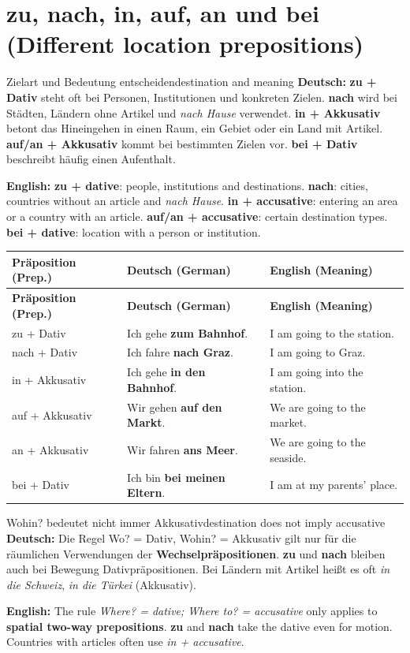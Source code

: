 \documentclass[a4paper,11pt]{article}
\newcommand{\GermanText}[1]{\textbf{Deutsch: }#1\par}
\newcommand{\EnglishText}[1]{{\small\color{SoftGray}\textbf{English: }#1\par}}
\newcommand{\TableHead}[1]{\color{white}\textbf{#1}}
\begin{document}
\section{zu, nach, in, auf, an und bei (Different location prepositions)}
\begin{grammarentry}{Zielart und Bedeutung entscheiden}{destination and meaning}
\GermanText{\textbf{zu + Dativ} steht oft bei Personen, Institutionen und konkreten Zielen. \textbf{nach} wird bei Städten, Ländern ohne Artikel und \emph{nach Hause} verwendet. \textbf{in + Akkusativ} betont das Hineingehen in einen Raum, ein Gebiet oder ein Land mit Artikel. \textbf{auf/an + Akkusativ} kommt bei bestimmten Zielen vor. \textbf{bei + Dativ} beschreibt häufig einen Aufenthalt.}
\EnglishText{\textbf{zu + dative}: people, institutions and destinations. \textbf{nach}: cities, countries without an article and \emph{nach Hause}. \textbf{in + accusative}: entering an area or a country with an article. \textbf{auf/an + accusative}: certain destination types. \textbf{bei + dative}: location with a person or institution.}
\end{grammarentry}
\begin{longtable}{>{\raggedright\arraybackslash}p{3.25cm}>{\raggedright\arraybackslash}p{5.55cm}>{\raggedright\arraybackslash}p{6cm}}
\rowcolor{HeaderBlueDark}\TableHead{Präposition (Prep.)} & \TableHead{Deutsch (German)} & \TableHead{English (Meaning)}\\
\endfirsthead
\rowcolor{HeaderBlueDark}\TableHead{Präposition (Prep.)} & \TableHead{Deutsch (German)} & \TableHead{English (Meaning)}\\
\endhead
zu + Dativ & Ich gehe \textbf{zum Bahnhof}. & I am going to the station.\\
nach + Dativ & Ich fahre \textbf{nach Graz}. & I am going to Graz.\\
in + Akkusativ & Ich gehe \textbf{in den Bahnhof}. & I am going into the station.\\
auf + Akkusativ & Wir gehen \textbf{auf den Markt}. & We are going to the market.\\
an + Akkusativ & Wir fahren \textbf{ans Meer}. & We are going to the seaside.\\
bei + Dativ & Ich bin \textbf{bei meinen Eltern}. & I am at my parents' place.\\
\end{longtable}
\begin{grammarentry}{Wohin? bedeutet nicht immer Akkusativ}{destination does not imply accusative}
\GermanText{Die Regel \glqq Wo? = Dativ, Wohin? = Akkusativ\grqq{} gilt nur für die räumlichen Verwendungen der \textbf{Wechselpräpositionen}. \textbf{zu} und \textbf{nach} bleiben auch bei Bewegung Dativpräpositionen. Bei Ländern mit Artikel heißt es oft \emph{in die Schweiz}, \emph{in die Türkei} (Akkusativ).}
\EnglishText{The rule \emph{Where? = dative; Where to? = accusative} only applies to \textbf{spatial two-way prepositions}. \textbf{zu} and \textbf{nach} take the dative even for motion. Countries with articles often use \emph{in + accusative}.}
\end{grammarentry}
\end{document}
